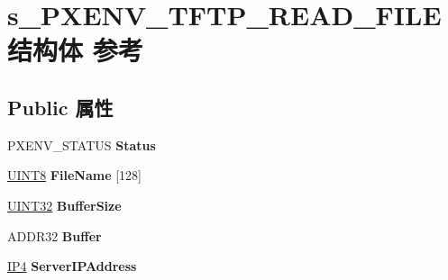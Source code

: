 \hypertarget{structs___p_x_e_n_v___t_f_t_p___r_e_a_d___f_i_l_e}{}\section{s\+\_\+\+P\+X\+E\+N\+V\+\_\+\+T\+F\+T\+P\+\_\+\+R\+E\+A\+D\+\_\+\+F\+I\+L\+E结构体 参考}
\label{structs___p_x_e_n_v___t_f_t_p___r_e_a_d___f_i_l_e}
\subsection*{Public 属性}
\begin{DoxyCompactItemize}
\item 
\mbox{\label{structs___p_x_e_n_v___t_f_t_p___r_e_a_d___f_i_l_e_a194265cc391f58762465b6245dd90cce}} 
P\+X\+E\+N\+V\+\_\+\+S\+T\+A\+T\+US {\bfseries Status}
\item 
\mbox{\label{structs___p_x_e_n_v___t_f_t_p___r_e_a_d___f_i_l_e_a91a7312e3445b8410f95766b13e03a3a}} 
\hyperlink{_processor_bind_8h_ab27e9918b538ce9d8ca692479b375b6a}{U\+I\+N\+T8} {\bfseries File\+Name} \mbox{[}128\mbox{]}
\item 
\mbox{\label{structs___p_x_e_n_v___t_f_t_p___r_e_a_d___f_i_l_e_af36fa76c1e4579e538b1011cb0db6044}} 
\hyperlink{_processor_bind_8h_ae1e6edbbc26d6fbc71a90190d0266018}{U\+I\+N\+T32} {\bfseries Buffer\+Size}
\item 
\mbox{\label{structs___p_x_e_n_v___t_f_t_p___r_e_a_d___f_i_l_e_a64ff8f8d6242b9259f5ecb5c35d4a2b6}} 
A\+D\+D\+R32 {\bfseries Buffer}
\item 
\mbox{\label{structs___p_x_e_n_v___t_f_t_p___r_e_a_d___f_i_l_e_af564730fc3142a3833e519823d1b7bc7}} 
\hyperlink{union_i_p4}{I\+P4} {\bfseries Server\+I\+P\+Address}
\item 
\mbox{\label{structs___p_x_e_n_v___t_f_t_p___r_e_a_d___f_i_l_e_a317176790d3f020b2176dd05f38030df}} 

\end{DoxyCompactItemize}
